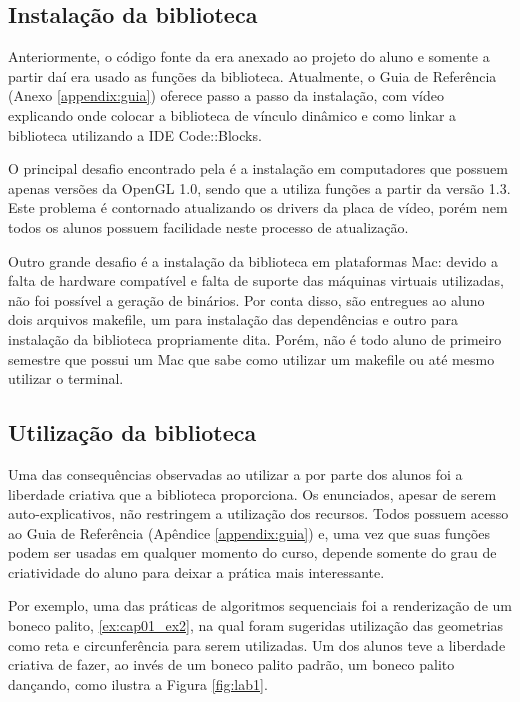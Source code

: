 \subsection{Instalação da biblioteca}
Anteriormente, o código fonte da \playAPC{} era anexado ao projeto do aluno e somente a partir daí era usado as funções da biblioteca. Atualmente, o Guia de Referência (Anexo \ref{appendix:guia}) oferece passo a passo da instalação, com vídeo explicando onde colocar a biblioteca de vínculo dinâmico e como linkar a biblioteca utilizando a IDE Code::Blocks.

O principal desafio encontrado pela \playAPC{} é a instalação em computadores que possuem apenas versões da OpenGL 1.0, sendo que a \playAPC{} utiliza funções a partir da versão 1.3. Este problema é contornado atualizando os drivers da placa de vídeo, porém nem todos os alunos possuem facilidade neste processo de atualização.

Outro grande desafio é a instalação da biblioteca em plataformas Mac: devido a falta de hardware compatível e falta de suporte das máquinas virtuais utilizadas, não foi possível a geração de binários. Por conta disso, são entregues ao aluno dois arquivos makefile, um para instalação das dependências e outro para instalação da biblioteca propriamente dita. Porém, não é todo aluno de primeiro semestre que possui um Mac que sabe como utilizar um makefile ou até mesmo utilizar o terminal.

\subsection{Utilização da biblioteca}
Uma das consequências observadas ao utilizar a \playAPC{} por parte dos alunos foi a liberdade criativa que a biblioteca proporciona. Os enunciados, apesar de serem auto-explicativos, não restringem a utilização dos recursos. Todos possuem acesso ao Guia de Referência (Apêndice \ref{appendix:guia}) e, uma vez que suas funções podem ser usadas em qualquer momento do curso, depende somente do grau de criatividade do aluno para deixar a prática mais interessante.

Por exemplo, uma das práticas de algoritmos sequenciais foi a renderização de um boneco palito, \ref{ex:cap01_ex2}, na qual foram sugeridas utilização das geometrias como reta e circunferência para serem utilizadas. Um dos alunos teve a liberdade criativa de fazer, ao invés de um boneco palito padrão, um boneco palito dançando, como ilustra a Figura \ref{fig:lab1}.

